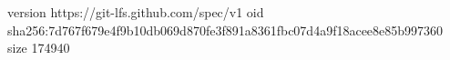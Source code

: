 version https://git-lfs.github.com/spec/v1
oid sha256:7d767f679e4f9b10db069d870fe3f891a8361fbc07d4a9f18acee8e85b997360
size 174940
